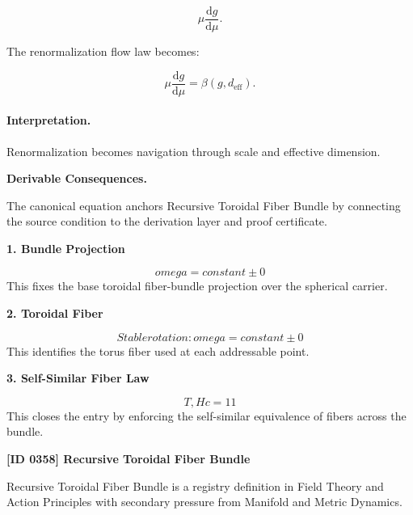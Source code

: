 \begin{equation}
\mu\frac{\mathrm{d}g}{\mathrm{d}\mu}.
\end{equation}

The renormalization flow law becomes:

\begin{equation}
\boxed{
\mu\frac{\mathrm{d}g}{\mathrm{d}\mu}
=
\beta(g,d_{\mathrm{eff}}).
}
\end{equation}

\paragraph{Interpretation.}
Renormalization becomes navigation through scale and effective dimension.

\par\vspace{0.35em}
\noindent\textbf{Derivable Consequences.}\quad
\begingroup
\footnotesize
\raggedright
The canonical equation anchors Recursive Toroidal Fiber Bundle by connecting the source condition to the derivation layer and proof certificate.
\par\endgroup

\noindent\textbf{1. Bundle Projection}\par
\[
omega = constant \pm 0
\]
\noindent This fixes the base toroidal fiber-bundle projection over the spherical carrier.\par
\noindent\textbf{2. Toroidal Fiber}\par
\[
Stable rotation: omega = constant \pm 0
\]
\noindent This identifies the torus fiber used at each addressable point.\par
\noindent\textbf{3. Self-Similar Fiber Law}\par
\[
T, Hc = 11
\]
\noindent This closes the entry by enforcing the self-similar equivalence of fibers across the bundle.\par

\clearpage
\noindent\textbf{[ID 0358] Recursive Toroidal Fiber Bundle}\par
\vspace{0.35em}
\begingroup\small
{}
Recursive Toroidal Fiber Bundle is a registry definition in Field Theory and Action Principles with secondary pressure from Manifold and Metric Dynamics.

